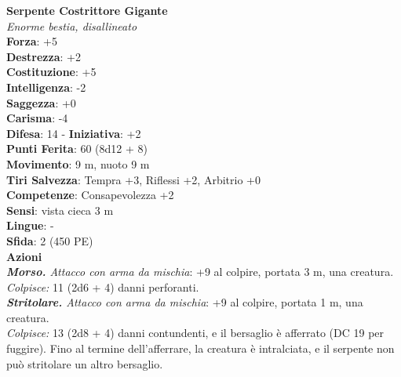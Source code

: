 \begin{multicols}{2}
\medskip\textbf{Serpente Costrittore Gigante}\\
\emph{Enorme bestia, disallineato}\\
\textbf{Forza}: +5\\
\textbf{Destrezza}: +2\\
\textbf{Costituzione}: +5\\
\textbf{Intelligenza}: -2\\
\textbf{Saggezza}: +0\\
\textbf{Carisma}: -4\\
\textbf{Difesa}: 14 - \textbf{Iniziativa}: +2\\
\textbf{Punti Ferita}: 60 (8d12 + 8)\\
\textbf{Movimento}: 9 m, nuoto 9 m\\
\textbf{Tiri Salvezza}: Tempra +3, Riflessi +2, Arbitrio +0\\
\textbf{Competenze}: Consapevolezza +2\\
\textbf{Sensi}: vista cieca 3 m\\
\textbf{Lingue}: -\\
\textbf{Sfida}: 2 (450 PE)\smallskip\\
\smallskip\textbf{Azioni}\\
\emph{\textbf{Morso.} Attacco con arma da mischia}: +9 al colpire, portata 3 m, una creatura.\\
\emph{Colpisce:} 11 (2d6 + 4) danni perforanti.\\
\emph{\textbf{Stritolare.} Attacco con arma da mischia}: +9 al colpire, portata 1 m, una creatura.\\
\emph{Colpisce:} 13 (2d8 + 4) danni contundenti, e il bersaglio è afferrato (DC  19 per fuggire). Fino al termine dell'afferrare, la creatura è intralciata, e il serpente non può stritolare un altro bersaglio.\\



\end{multicols}
